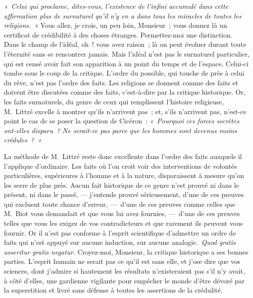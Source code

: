 \documentclass[french,twoside]{book} %
\newcommand\persName[1]{#1}
\begin{document}
\emph{« Celui qui proclame, dites-vous, l’existence de l’infini accumulé dans cette affirmation plus de surnaturel qu’il n’y en a dans tous les miracles de toutes les religions. »} Vous allez, je crois, un peu loin, Monsieur ; vous donnez là un certificat de crédibilité à des choses étranges. Permettez-moi une distinction. Dans le champ de l’idéal, oh ! vous avez raison ; là on peut évoluer durant toute l’éternité sans se rencontrer jamais. Mais l’idéal n’est pas le surnaturel particulier, qui est censé avoir fait son apparition à un point du temps et de l’espace. Celui-ci tombe sous le coup de la critique. L’ordre du possible, qui touche de près à celui du rêve, n’est pas l’ordre des faits. Les religions se donnent comme des faits et doivent être discutées comme des faits, c’est-à-dire par la critique historique. Or, les faits surnaturels, du genre de ceux qui remplissent l’histoire religieuse, {\persName M. Littré} excelle à montrer qu’ils n’arrivent pas ; et, s’ils n’arrivent pas, n’est-ce point le cas de se poser la question de {\persName Cicéron} : \emph{« Pourquoi ces forces secrètes ont-elles disparu ? Ne serait-ce pas parce que les hommes sont devenus moins crédules ? »}\par
La méthode de {\persName M. Littré} reste donc excellente dans l’ordre des faits auxquels il l’applique d’ordinaire. Les faits où l’on croit voir des interventions de volontés particulières, supérieures à l’homme et à la nature, disparaissent à mesure qu’on les serre de plus près. Aucun fait historique de ce genre n’est prouvé ni dans le présent, ni dans le passé, — j’entends prouvé sérieusement, d’une de ces preuves qui excluent toute chance d’erreur, — d’une de ces preuves comme celles que {\persName M. Biot} vous demandait et que vous lui avez fournies, — d’une de ces preuves telles que vous les exigez de vos contradicteurs et que rarement ils peuvent vous fournir. Or il n’est pas conforme à l’esprit scientifique d’admettre un ordre de faits qui n’est appuyé sur aucune induction, sur aucune analogie. \emph{Quod gratis asseritur gratis negatur.} Croyez-moi, Monsieur, la critique historique a ses bonnes parties. L’esprit humain ne serait pas ce qu’il est sans elle, et j’ose dire que vos sciences, dont j’admire si hautement les résultats n’existeraient pas s’il n’y avait, à côté d’elles, une gardienne vigilante pour empêcher le monde d’être dévoré par la superstition et livré sans défense à toutes les assertions de la crédulité.\par
\end{document}
